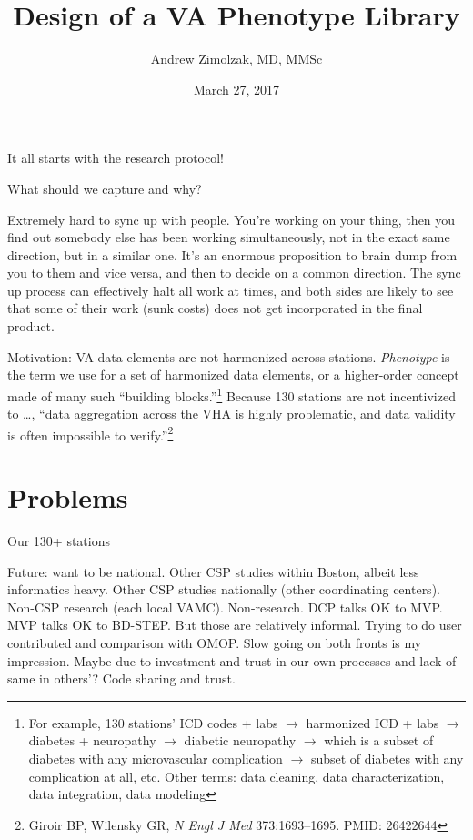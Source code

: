 \documentclass{tufte-handout}
\title{Design of a VA Phenotype Library}
\author{Andrew Zimolzak, MD, MMSc}
\date{March 27, 2017}
\begin{document}
\maketitle

It all starts with the research protocol!

What should we capture and why?

Extremely hard to sync up with people. You're working on your thing,
then you find out somebody else has been working simultaneously, not
in the exact same direction, but in a similar one. It's an enormous
proposition to brain dump from you to them and vice versa, and then to
decide on a common direction. The sync up process can effectively halt
all work at times, and both sides are likely to see that some of their
work (sunk costs) does not get incorporated in the final product.

Motivation: VA data elements are not harmonized across stations.
\emph{Phenotype} is the term we use for a set of harmonized data
elements, or a higher-order concept made of many such ``building
blocks.''\footnote{For example, 130 stations' ICD codes + labs $\to$
  harmonized ICD + labs $\to$ diabetes + neuropathy $\to$ diabetic
  neuropathy $\to$ which is a subset of diabetes with any
  microvascular complication $\to$ subset of diabetes with any
  complication at all, etc. Other terms: data cleaning, data
  characterization, data integration, data modeling} Because 130
stations are not incentivized to \ldots{}, %
``data aggregation across the
VHA is highly problematic, and data validity is often impossible to
verify.''\footnote{Giroir BP, Wilensky GR, \emph{N Engl J Med}
  373:1693--1695. PMID: 26422644}

\section{Problems}

Our 130+ stations %

Future: want to be national. Other CSP studies within Boston, albeit
less informatics heavy. Other CSP studies nationally (other
coordinating centers). Non-CSP research (each local VAMC).
Non-research. DCP talks OK to MVP. MVP talks OK to BD-STEP. But those
are relatively informal. Trying to do user contributed and comparison
with OMOP. Slow going on both fronts is my impression. Maybe due to
investment and trust in our own processes and lack of same in others'?
Code sharing and trust.
\end{document}
